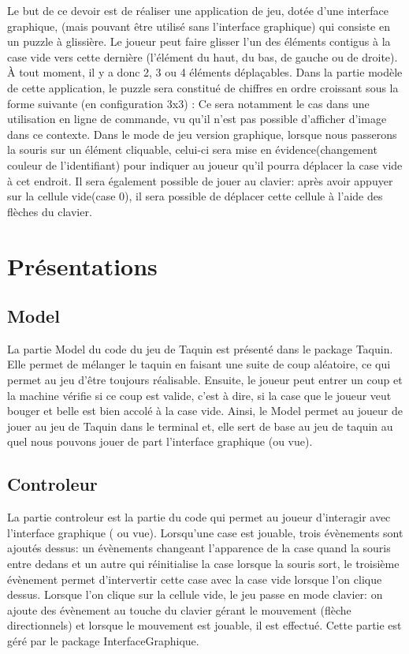 \documentclass[12pt]{article}
\begin{document}
	Le but de ce devoir est de réaliser une application de jeu, dotée d'une interface graphique, (mais pouvant être utilisé sans l'interface graphique) qui consiste en un puzzle à glissière.
Le joueur peut faire glisser l'un des éléments contigus à la case vide vers cette dernière (l'élément du haut, du bas, de gauche ou de droite). À tout moment, il y a donc 2, 3 ou 4 éléments déplaçables. 
Dans la partie modèle de cette application, le puzzle sera constitué de chiffres en ordre croissant sous la forme suivante (en configuration 3x3) : 
Ce sera notamment le cas dans une utilisation en ligne de commande, vu qu'il n'est pas possible d'afficher d'image dans ce contexte. 
Dans le mode de jeu version graphique, lorsque nous passerons la souris sur un élément cliquable, celui-ci sera mise en évidence(changement couleur de l'identifiant) pour indiquer au joueur qu'il pourra déplacer la case vide à cet endroit. Il sera également possible de jouer au clavier: après avoir appuyer sur la cellule vide(case 0), il sera possible de déplacer cette cellule à l'aide des flèches du clavier.
	
\vspace{10pt}

\section{Présentations}
\subsection{Model}
	La partie Model du code du jeu de Taquin est présenté dans le package Taquin. 
Elle permet de mélanger le taquin en faisant une suite de coup aléatoire, ce qui permet au jeu d'être toujours réalisable.
Ensuite, le joueur peut entrer un coup et la machine vérifie si ce coup est valide, c'est à dire, si la case que le joueur veut bouger et belle est bien accolé à la case vide.
Ainsi, le Model permet au joueur de jouer au jeu de Taquin dans le terminal et, elle sert de base au jeu de taquin au quel nous pouvons jouer de part l'interface graphique (ou vue).

\subsection{Controleur}
	La partie controleur est la partie du code qui permet au joueur d'interagir avec l'interface graphique ( ou vue). 
Lorsqu'une case est jouable, trois évènements sont ajoutés dessus: un évènements changeant l'apparence de la case quand la souris entre dedans et un autre qui réinitialise la case lorsque la souris sort, le troisième évènement permet d'intervertir cette case avec la case vide lorsque l'on clique dessus. Lorsque l'on clique sur la cellule vide, le jeu passe en mode clavier: on ajoute des évènement au touche du clavier gérant le mouvement (flèche directionnels) et lorsque le mouvement est jouable, il est effectué. Cette partie est géré par le package InterfaceGraphique.
\end{document}
